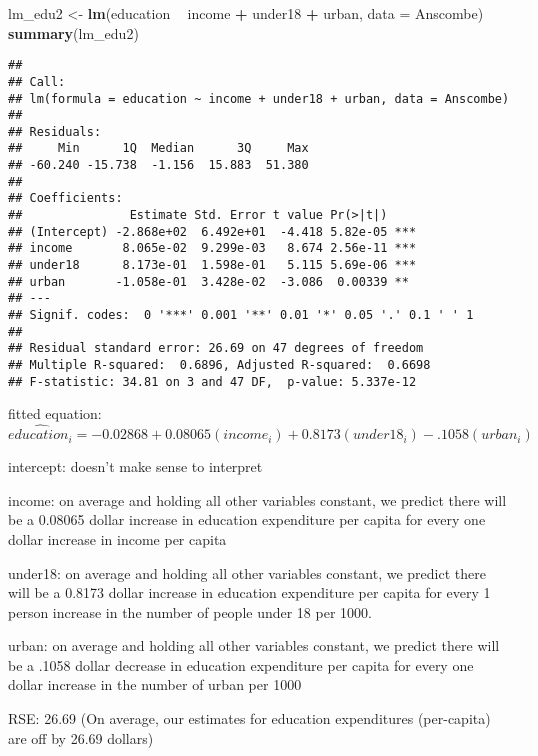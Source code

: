 \documentclass[
]{article}
\newenvironment{Shaded}{\begin{snugshade}}{\end{snugshade}}
\newcommand{\DataTypeTok}[1]{\textcolor[rgb]{0.13,0.29,0.53}{#1}}
\newcommand{\KeywordTok}[1]{\textcolor[rgb]{0.13,0.29,0.53}{\textbf{#1}}}
\newcommand{\NormalTok}[1]{#1}
\newcommand{\OperatorTok}[1]{\textcolor[rgb]{0.81,0.36,0.00}{\textbf{#1}}}
\newcommand{\StringTok}[1]{\textcolor[rgb]{0.31,0.60,0.02}{#1}}
\begin{document}
\begin{Shaded}
\begin{Highlighting}[]
\NormalTok{lm_edu2 <-}\StringTok{ }\KeywordTok{lm}\NormalTok{(education }\OperatorTok{~}\StringTok{ }\NormalTok{income }\OperatorTok{+}\StringTok{ }\NormalTok{under18 }\OperatorTok{+}\StringTok{ }\NormalTok{urban, }\DataTypeTok{data =}\NormalTok{ Anscombe)}
\KeywordTok{summary}\NormalTok{(lm_edu2)}
\end{Highlighting}
\end{Shaded}

\begin{verbatim}
## 
## Call:
## lm(formula = education ~ income + under18 + urban, data = Anscombe)
## 
## Residuals:
##     Min      1Q  Median      3Q     Max 
## -60.240 -15.738  -1.156  15.883  51.380 
## 
## Coefficients:
##               Estimate Std. Error t value Pr(>|t|)    
## (Intercept) -2.868e+02  6.492e+01  -4.418 5.82e-05 ***
## income       8.065e-02  9.299e-03   8.674 2.56e-11 ***
## under18      8.173e-01  1.598e-01   5.115 5.69e-06 ***
## urban       -1.058e-01  3.428e-02  -3.086  0.00339 ** 
## ---
## Signif. codes:  0 '***' 0.001 '**' 0.01 '*' 0.05 '.' 0.1 ' ' 1
## 
## Residual standard error: 26.69 on 47 degrees of freedom
## Multiple R-squared:  0.6896, Adjusted R-squared:  0.6698 
## F-statistic: 34.81 on 3 and 47 DF,  p-value: 5.337e-12
\end{verbatim}

fitted equation:
\(\hat{education_i} = -0.02868 + 0.08065(income_i) + 0.8173(under18_i) -.1058(urban_i)\)

intercept: doesn't make sense to interpret

income: on average and holding all other variables constant, we predict
there will be a 0.08065 dollar increase in education expenditure per
capita for every one dollar increase in income per capita

under18: on average and holding all other variables constant, we predict
there will be a 0.8173 dollar increase in education expenditure per
capita for every 1 person increase in the number of people under 18 per
1000.

urban: on average and holding all other variables constant, we predict
there will be a .1058 dollar decrease in education expenditure per
capita for every one dollar increase in the number of urban per 1000

RSE: 26.69 (On average, our estimates for education expenditures
(per-capita) are off by 26.69 dollars)
\end{document}
